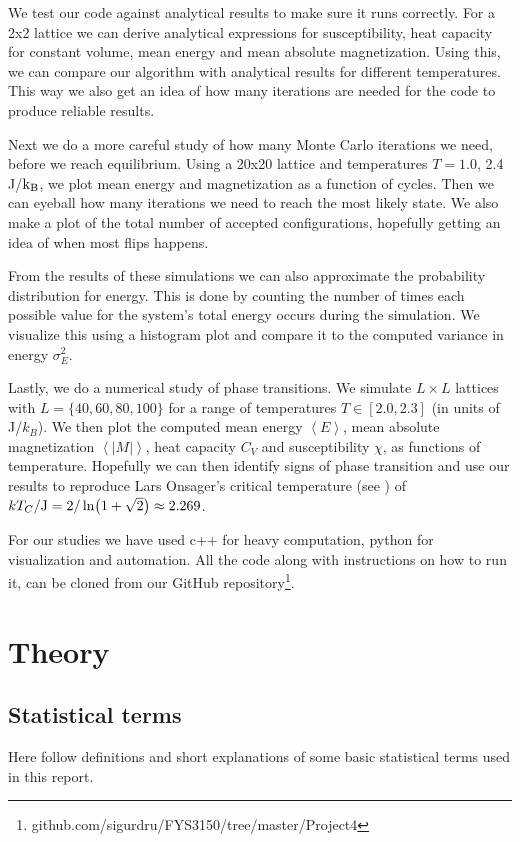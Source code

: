 \documentclass[reprint, english,notitlepage,nofootinbib]{revtex4-1}  %
\begin{document}
We test our code against analytical results to make sure it runs correctly. For a 2x2 lattice we can derive analytical expressions for susceptibility, heat capacity for constant volume, mean energy and mean absolute magnetization. Using this, we can compare our algorithm with analytical results for different temperatures. This way we also get an idea of how many iterations are needed for the code to produce reliable results.

Next we do a more careful study of how many Monte Carlo iterations we need, before we reach equilibrium. Using a 20x20 lattice and temperatures $T = 1.0$, 2.4 J/$\rm k_B$, we plot mean energy and magnetization as a function of cycles. Then we can eyeball how many iterations we need to reach the most likely state. We also make a plot of the total number of accepted configurations, hopefully getting an idea of when most flips happens.

From the results of these simulations we can also approximate the probability distribution for energy. This is done by counting the number of times each possible value for the system's total energy occurs during the simulation. We visualize this using a histogram plot and compare it to the computed variance in energy $\sigma_E^2$.

Lastly, we do a numerical study of phase transitions. We simulate $L \times L$ lattices with $L = \{40, 60, 80, 100\}$ for a range of temperatures $T\in[2.0,2.3]$ (in units of J/$k_B$). We then plot the computed mean energy $\left<E\right>$, mean absolute magnetization $\left<|M|\right>$, heat capacity $C_V$ and susceptibility $\chi$, as functions of temperature. Hopefully we can then identify signs of phase transition and use our results to reproduce Lars Onsager's critical temperature (see \cite{larsonsager}) of $kT_C/\rm{J}=2/\ln(1+\sqrt{2})\approx2.269$.

For our studies we have used c++ for heavy computation, python for visualization and automation. All the code along with instructions on how to run it, can be cloned from our GitHub repository\footnote{github.com/sigurdru/FYS3150/tree/master/Project4}.

\section{Theory}

\subsection*{Statistical terms}
Here follow definitions and short explanations of some basic statistical terms used in this report.
\end{document}
